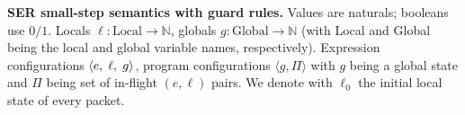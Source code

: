 %
%
    








\noindent\textbf{SER small-step semantics with guard rules.}
%
%
Values are naturals; booleans use $0/1$. Locals $\ell:\mathrm{Local}\to\mathbb{N}$, globals $g:\mathrm{Global}\to\mathbb{N}$ (with Local and Global being the local and global variable names, respectively).
Expression configurations $\langle e,\; \ell,\; g\rangle$, program configurations $\langle g , \Pi\rangle$ with \(g\) being a global state and \(\Pi\) being set of in-flight \((e,\ell)\) pairs.
%
We denote with \(\ell_0\) the initial local state of every packet.


